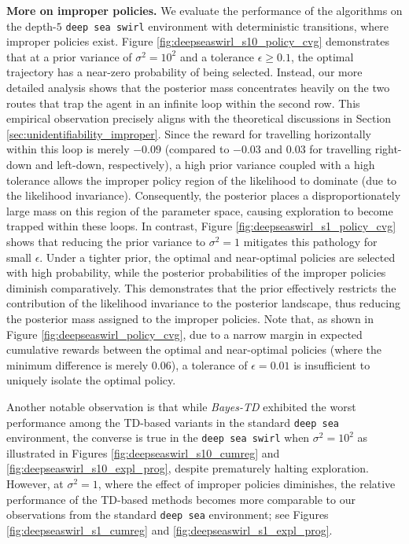 \documentclass{amsart}
\begin{document}
\textbf{More on improper policies.} We evaluate the performance of the algorithms on the depth-$5$ \texttt{deep sea swirl} environment with deterministic transitions, where improper policies exist. Figure \ref{fig:deepseaswirl_s10_policy_cvg} demonstrates that at a prior variance of $\sigma^2=10^2$ and a tolerance $\epsilon \geq 0.1$, the optimal trajectory has a near-zero probability of being selected. Instead, our more detailed analysis shows that the posterior mass concentrates heavily on the two routes that trap the agent in an infinite loop within the second row. This empirical observation precisely aligns with the theoretical discussions in Section \ref{sec:unidentifiability_improper}. Since the reward for travelling horizontally within this loop is merely $-0.09$ (compared to $-0.03$ and $0.03$ for travelling right-down and left-down, respectively), a high prior variance coupled with a high tolerance allows the improper policy region of the likelihood to dominate (due to the likelihood invariance). Consequently, the posterior places a disproportionately large mass on this region of the parameter space, causing exploration to become trapped within these loops. In contrast, Figure \ref{fig:deepseaswirl_s1_policy_cvg} shows that reducing the prior variance to $\sigma^2=1$ mitigates this pathology for small $\epsilon$. Under a tighter prior, the optimal and near-optimal policies are selected with high probability, while the posterior probabilities of the improper policies diminish comparatively. This demonstrates that the prior effectively restricts the contribution of the likelihood invariance to the posterior landscape, thus reducing the posterior mass assigned to the improper policies. Note that, as shown in Figure \ref{fig:deepseaswirl_policy_cvg}, due to a narrow margin in expected cumulative rewards between the optimal and near-optimal policies (where the minimum difference is merely $0.06$), a tolerance of $\epsilon=0.01$ is insufficient to uniquely isolate the optimal policy.

Another notable observation is that while \textit{Bayes-TD} exhibited the worst performance among the TD-based variants in the standard \texttt{deep sea} environment, the converse is true in the \texttt{deep sea swirl} when $\sigma^2=10^2$ as illustrated in Figures \ref{fig:deepseaswirl_s10_cumreg} and \ref{fig:deepseaswirl_s10_expl_prog}, despite prematurely halting exploration. However, at $\sigma^2=1$, where the effect of improper policies diminishes, the relative performance of the TD-based methods becomes more comparable to our observations from the standard \texttt{deep sea} environment; see Figures \ref{fig:deepseaswirl_s1_cumreg} and \ref{fig:deepseaswirl_s1_expl_prog}.
\end{document}
